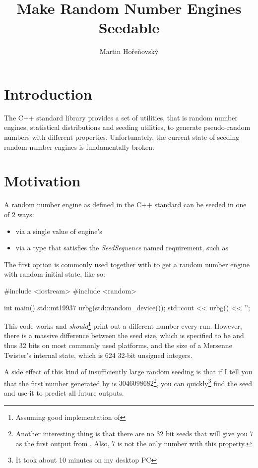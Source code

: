 \documentclass{wg21}
\title{Make Random Number Engines Seedable}
\author{Martin Hořeňovský}{martin.horenovsky@gmail.com}
\begin{document}
\maketitle


\hypertarget{introduction}{%
    \section{Introduction}\label{introduction}}

The C++ standard library provides a set of utilities, that is random
number engines, statistical distributions and seeding utilities, to
generate pseudo-random numbers with different properties. Unfortunately,
the current state of seeding random number engines is fundamentally
broken.


\hypertarget{motivation}{%
    \section{Motivation}\label{motivation}}

A random number engine as defined in the C++ standard can be seeded in
one of 2 ways:
\begin{itemize}
    \item via a single value of engine's 
    \item via a type that satisfies the \emph{SeedSequence} named requirement, such as 
\end{itemize}

The first option is commonly used together with 
to get a random number engine with random initial state, like so:

\begin{codeblock}
#include <iostream>
#include <random>

int main() {
    std::mt19937 urbg(std::random_device{}());
    std::cout << urbg() << '\n';
}
\end{codeblock}

This code works and \emph{should}\footnote{Assuming good implementation
of } print out a different number every run. However,
there is a massive difference between the seed size, which is specified
to be  and thus 32 bits on most commonly used platforms,
and the size of a Mersenne Twister's internal state, which is 624 32-bit
unsigned integers.

A side effect of this kind of insufficiently large random seeding is that
if I tell you that the first number generated by  is
\(3046098682\)\footnote{Another interesting thing is that there are no
32 bit seeds that will give you 7 as the first output from .
Also, 7 is not the only number with this property.},
you can quickly\footnote{It took about 10 minutes on my desktop PC}
find the seed and use it to predict all future outputs.
\end{document}
